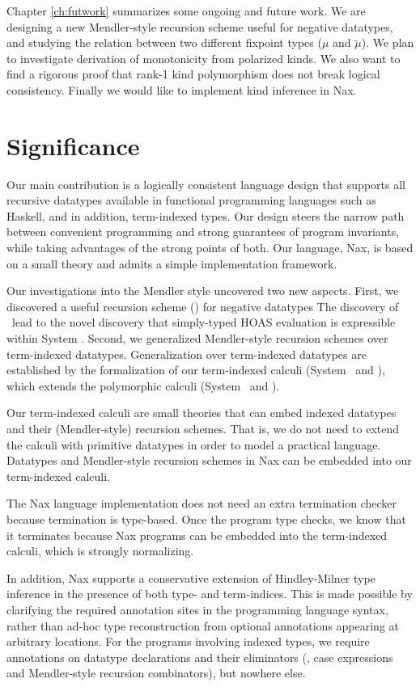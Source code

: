 Chapter \ref{ch:futwork} summarizes some ongoing and future work.
We are designing a new Mendler-style recursion scheme useful
for negative datatypes, and studying the relation between two different
fixpoint types ($\mu$ and $\breve\mu$). We plan to investigate derivation of
monotonicity from polarized kinds. We also want to find a rigorous proof 
that rank-1 kind polymorphism does not break logical consistency.
Finally we would like to implement kind inference in Nax.

\section{Significance}\label{sec:concl:sig}
Our main contribution is a logically consistent language design that supports
all recursive datatypes available in functional programming languages such as
Haskell, and in addition, term-indexed types. Our design steers the narrow
path between convenient programming and strong guarantees of program invariants,
while taking advantages of the strong points of both. Our language, Nax, is
based on a small theory and admits a simple implementation framework.

Our investigations into the Mendler style uncovered two new aspects.
First, we discovered a useful recursion scheme (\MsfIt) for negative datatypes
The discovery of \MsfIt\ lead to the novel discovery that simply-typed HOAS
evaluation is expressible within System \Fw. Second, we generalized
Mendler-style recursion schemes over term-indexed datatypes.
Generalization over term-indexed datatypes are established by
the formalization of our term-indexed calculi (System \Fi\ and \Fixi),
which extends the polymorphic calculi (System \Fw\ and \Fixw).

Our term-indexed calculi are small theories that can embed indexed datatypes
and their (Mendler-style) recursion schemes. That is, we do not need to extend
the calculi with primitive datatypes in order to model a practical language.
Datatypes and Mendler-style recursion schemes in Nax can be embedded into
our term-indexed calculi.

The Nax language implementation does not need an extra termination checker
because termination is type-based. Once the program type checks, we know
that it terminates because Nax programs can be embedded into
the term-indexed calculi, which is strongly normalizing.

In addition, Nax supports a conservative extension of Hindley-Milner
type inference in the presence of both type- and term-indices.
This is made possible by clarifying the required annotation sites
in the programming language syntax, rather than ad-hoc type reconstruction
from optional annotations appearing at arbitrary locations.
For the programs involving indexed types, we require annotations
on datatype declarations and their eliminators
(\ie, case expressions and Mendler-style recursion combinators),
but nowhere else.

